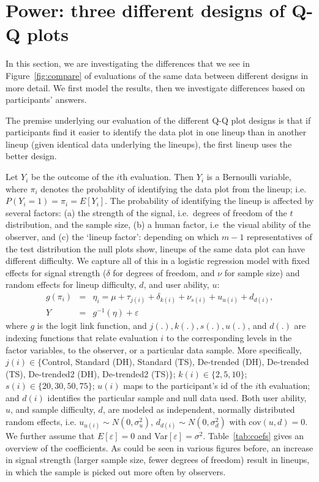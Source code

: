 \documentclass{article}\usepackage[]{graphicx}\usepackage[]{color}
\newcommand{\hh}[1]{{\color{magenta} #1}}
\begin{document}
\section{Power: three different designs of Q-Q plots}\label{sec:power1}

\hh{In this section, we are investigating the differences that we see in Figure~\ref{fig:compare} of evaluations of the same data between different designs in more detail. We first model the results, then we investigate differences based on participants' answers. }

\hh{The premise underlying our} evaluation of the different Q-Q plot designs is that if participants find it easier to identify the data plot in one lineup than in another lineup (given identical data underlying the lineups), the first lineup uses the better design.

Let $Y_i$ be the outcome of the $i$th evaluation. Then $Y_i$ is a Bernoulli variable, where $\pi_i$ denotes the probablity of identifying the data plot from the lineup; i.e.~$P(Y_i = 1) = \pi_i = E[Y_i]$.   
The probability of identifying the lineup is affected by several factors: (a) the strength of the signal, i.e.~degrees of freedom of the $t$ distribution, and the sample size, (b) a human factor, i.e~the visual ability of the observer, and (c)  the `lineup factor': depending on which $m-1$ representatives of the test distribution the null plots show, lineups of the same data plot can have different difficulty. We capture all of this in a logistic regression model with fixed effects for signal strength ($\delta$ for degrees of freedom, and $\nu$ for sample size) and random effects for lineup difficulty, $d$, and user ability, $u$: 
\begin{eqnarray*}
g(\pi_i) &=& \eta_i = \mu + \tau_{j(i)} +\delta_{k(i)}+ \nu_{s(i)} + u_{u(i)} + d_{d(i)},\\
Y &=& g^{-1}(\eta) + \varepsilon
\end{eqnarray*}
where $g$ is the logit link function, and $j(.), k(.), s(.), u(.)$, and $d(.)$ are  indexing functions that relate evaluation $i$ to the corresponding levels in the factor variables, to the observer, or a particular data sample. More specifically, $j(i) \in \{$Control, Standard (DH), Standard (TS), De-trended (DH), De-trended (TS), De-trended2 (DH), De-trended2 (TS)$\}$; $k(i) \in \{2,5,10\}$; $s(i) \in \{20, 30, 50, 75\}$; $u(i)$ maps to the participant's id of the $i$th evaluation; and $d(i)$ identifies the particular sample \hh{and null data} used. 
Both user ability, $u$, and sample difficulty, $d$, are modeled as independent, normally distributed  random effects, i.e. $u_{u(i)} \sim N(0, \sigma_u^2)$, $d_{d(i)} \sim N(0,\sigma_d^2)$ with cov$(u, d) = 0$. We further assume that $E[\varepsilon] = 0$ and Var$[\varepsilon]=\sigma^2$.
%
\hh{Table~\ref{tab:coefs} gives an overview of the coefficients. As could be seen in various figures before, an increase in signal strength (larger sample size, fewer degrees of freedom) result in lineups, in which the sample is picked out more often by observers.}
\end{document}
